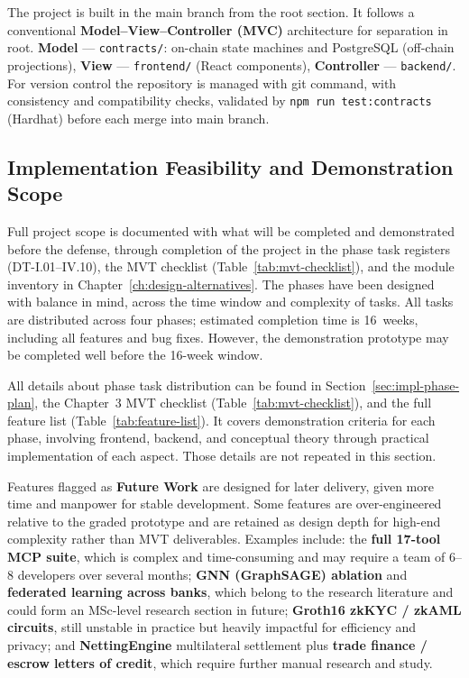 The project is built in the main branch from the root section. It follows a conventional \textbf{Model--View--Controller (MVC)} architecture for separation in root. \textbf{Model} --- \texttt{contracts/}: on-chain state machines and PostgreSQL (off-chain projections), \textbf{View} --- \texttt{frontend/} (React components), \textbf{Controller} --- \texttt{backend/}. For version control the repository is managed with git command, with consistency and compatibility checks, validated by \texttt{npm run test:contracts} (Hardhat) before each merge into main branch.

\subsection{Implementation Feasibility and Demonstration Scope}
\label{sec:impl-feasibility}

Full project scope is documented with what will be completed and demonstrated before the defense, through completion of the project in the phase task registers (DT-I.01--IV.10), the MVT checklist (Table~\ref{tab:mvt-checklist}), and the module inventory in Chapter~\ref{ch:design-alternatives}. The phases have been designed with balance in mind, across the time window and complexity of tasks. All tasks are distributed across four phases; estimated completion time is 16~weeks, including all features and bug fixes. However, the demonstration prototype may be completed well before the 16-week window.

All details about phase task distribution can be found in Section~\ref{sec:impl-phase-plan}, the Chapter~3 MVT checklist (Table~\ref{tab:mvt-checklist}), and the full feature list (Table~\ref{tab:feature-list}). It covers demonstration criteria for each phase, involving frontend, backend, and conceptual theory through practical implementation of each aspect. Those details are not repeated in this section.

Features flagged as \textbf{Future Work} are designed for later delivery, given more time and manpower for stable development. Some features are over-engineered relative to the graded prototype and are retained as design depth for high-end complexity rather than MVT deliverables. Examples include: the \textbf{full 17-tool MCP suite}, which is complex and time-consuming and may require a team of 6--8 developers over several months; \textbf{GNN (GraphSAGE) ablation} and \textbf{federated learning across banks}, which belong to the research literature and could form an MSc-level research section in future; \textbf{Groth16 zkKYC / zkAML circuits}, still unstable in practice but heavily impactful for efficiency and privacy; and \textbf{NettingEngine} multilateral settlement plus \textbf{trade finance / escrow letters of credit}, which require further manual research and study.

